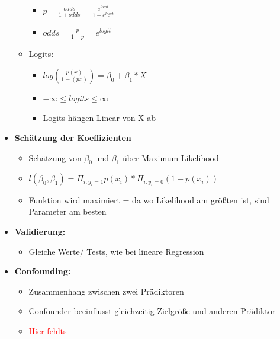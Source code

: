 \documentclass[a4paper]{article}
\begin{document}
\begin{landscape}
\begin{multicols}{3}
\begin{itemize}[noitemsep,nolistsep,leftmargin=*]
\begin{itemize}[noitemsep,nolistsep,leftmargin=*]
\begin{itemize}[noitemsep,nolistsep,leftmargin=*]
                    \item $p = \frac{odds}{1+odds} = \frac{e^{logit}}{1+e^{logit}}$
                    \item $odds = \frac{p}{1-p} = e^{logit}$
                \end{itemize}
                \item Logits:
                \begin{itemize}[noitemsep,nolistsep,leftmargin=*]
                    \item $log(\frac{p(x)}{1-(px)})= \beta_0+\beta_1*X$
                    \item $-\infty \leq logits \leq \infty$
                    \item Logits hängen Linear von X ab
                \end{itemize}
            \end{itemize}
            \item \textbf{Schätzung der Koeffizienten}
            \begin{itemize}[noitemsep,nolistsep,leftmargin=*]
                \item Schätzung von $\beta_0$ und $\beta_1$ über Maximum-Likelihood
                \item $l(\beta_0, \beta_1)= \Pi_{i:y_i=1} p(x_i) * \Pi_{i:y_i=0} (1-p(x_i)) $
                \item Funktion wird maximiert = da wo Likelihood am größten ist, sind Parameter am besten
            \end{itemize}
            \item \textbf{Validierung:}
            \begin{itemize}[noitemsep,nolistsep,leftmargin=*]
                \item Gleiche Werte/ Tests, wie bei lineare Regression
            \end{itemize}
            \item \textbf{Confounding:}
            \begin{itemize}[noitemsep,nolistsep,leftmargin=*]
                \item Zusammenhang zwischen zwei Prädiktoren
                \item Confounder beeinflusst gleichzeitig Zielgröße und anderen Prädiktor
                \item \textcolor{red}{Hier fehlts}
            \end{itemize}
        \end{itemize}



\end{multicols}
\end{landscape}
\end{document}
